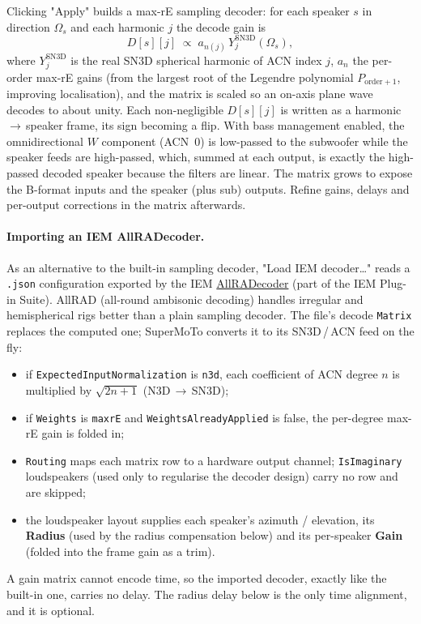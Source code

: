Clicking "Apply" builds a max-rE sampling decoder: for each speaker $s$ in direction $\Omega_s$ and each harmonic $j$ the decode gain is
\begin{equation}
  D[s][j] \;\propto\; a_{n(j)}\,Y_j^{\mathrm{SN3D}}(\Omega_s),
\end{equation}
where $Y_j^{\mathrm{SN3D}}$ is the real SN3D spherical harmonic of ACN index $j$, $a_n$ the per-order max-rE gains (from the largest root of the Legendre polynomial $P_{\mathrm{order}+1}$, improving localisation), and the matrix is scaled so an on-axis plane wave decodes to about unity. Each non-negligible $D[s][j]$ is written as a harmonic\,$\rightarrow$\,speaker frame, its sign becoming a  flip. With bass management enabled, the omnidirectional $W$ component (ACN~0) is low-passed to the subwoofer while the speaker feeds are high-passed, which, summed at each output, is exactly the high-passed decoded speaker because the filters are linear. The matrix grows to expose the B-format inputs and the speaker (plus sub) outputs. Refine gains, delays and per-output  corrections in the matrix afterwards.

\paragraph{Importing an IEM AllRADecoder.} As an alternative to the built-in sampling decoder, "Load IEM decoder\ldots" reads a \texttt{.json} configuration exported by the IEM \href{https://plugins.iem.at/#tab-AllRADecoder}{AllRADecoder} (part of the IEM Plug-in Suite). AllRAD (all-round ambisonic decoding) handles irregular and hemispherical rigs better than a plain sampling decoder. The file's decode \texttt{Matrix} replaces the computed one; SuperMoTo converts it to its SN3D\,/\,ACN feed on the fly:
\begin{itemize}[nosep]
  \item if \texttt{ExpectedInputNormalization} is \texttt{n3d}, each coefficient of ACN degree $n$ is multiplied by $\sqrt{2n+1}$ (N3D\,$\to$\,SN3D);
  \item if \texttt{Weights} is \texttt{maxrE} and \texttt{WeightsAlreadyApplied} is false, the per-degree max-rE gain is folded in;
  \item \texttt{Routing} maps each matrix row to a hardware output channel; \texttt{IsImaginary} loudspeakers (used only to regularise the decoder design) carry no row and are skipped;
  \item the loudspeaker layout supplies each speaker's azimuth / elevation, its \textbf{Radius} (used by the radius compensation below) and its per-speaker \textbf{Gain} (folded into the frame gain as a trim).
\end{itemize}
A gain matrix cannot encode time, so the imported decoder, exactly like the built-in one, carries no delay. The radius delay below is the only time alignment, and it is optional.

